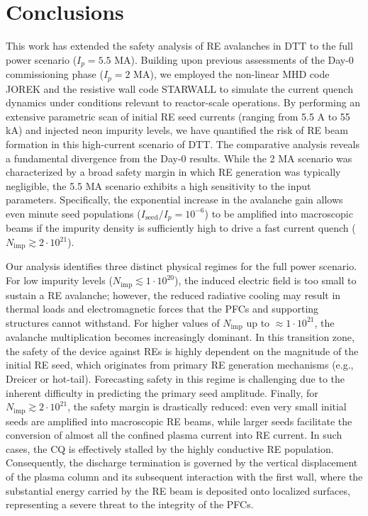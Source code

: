 \documentclass[aip,reprint]{revtex4-1}
\begin{document}
\section{Conclusions}
\label{sec:conclusion}
This work has extended the safety analysis of RE avalanches in DTT to the full power scenario ($I_{p}=5.5$ MA). Building upon previous assessments of the Day-0 commissioning phase ($I_{p}=2$ MA), we employed the non-linear MHD code JOREK and the resistive wall code STARWALL to simulate the current quench dynamics under conditions relevant to reactor-scale operations. By performing an extensive parametric scan of initial RE seed currents (ranging from 5.5 A to 55 kA) and injected neon impurity levels, we have quantified the risk of RE beam formation in this high-current scenario of DTT.
The comparative analysis reveals a fundamental divergence from the Day-0 results. While the 2 MA scenario was characterized by a broad safety margin in which RE generation was typically negligible, the 5.5 MA scenario exhibits a high sensitivity to the input parameters. Specifically, the exponential increase in the avalanche gain allows even minute seed populations ($I_\text{seed}/I_{p} = 10^{-6}$) to be amplified into macroscopic beams if the impurity density is sufficiently high to drive a fast current quench ($N_\text{imp} \gtrsim 2 \cdot 10^{21}$).

Our analysis identifies three distinct physical regimes for the full power scenario. For low impurity levels ($N_\text{imp} \lesssim 1\cdot10^{20}$), the induced electric field is too small to sustain a RE avalanche; however, the reduced radiative cooling may result in thermal loads and electromagnetic forces that the PFCs and supporting structures cannot withstand. For higher values of $N_\text{imp}$ up to $\approx 1\cdot10^{21}$, the avalanche multiplication becomes increasingly dominant. In this transition zone, the safety of the device against REs is highly dependent on the magnitude of the initial RE seed, which originates from primary RE generation mechanisms (e.g., Dreicer or hot-tail). Forecasting safety in this regime is challenging due to the inherent difficulty in predicting the primary seed amplitude. Finally, for $N_\text{imp} \gtrsim 2\cdot10^{21}$, the safety margin is drastically reduced: even very small initial seeds are amplified into macroscopic RE beams, while larger seeds facilitate the conversion of almost all the confined plasma current into RE current. In such cases, the CQ is effectively stalled by the highly conductive RE population. Consequently, the discharge termination is governed by the vertical displacement of the plasma column and its subsequent interaction with the first wall, where the substantial energy carried by the RE beam is deposited onto localized surfaces, representing a severe threat to the integrity of the PFCs.
\end{document}
